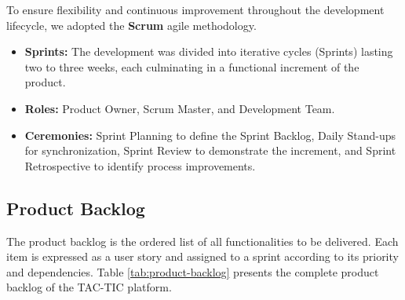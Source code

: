 To ensure flexibility and continuous improvement throughout the development lifecycle, we adopted the \textbf{Scrum} agile methodology.

\begin{itemize}
    \item \textbf{Sprints:} The development was divided into iterative cycles (Sprints) lasting two to three weeks, each culminating in a functional increment of the product.
    \item \textbf{Roles:} Product Owner, Scrum Master, and Development Team.
    \item \textbf{Ceremonies:} Sprint Planning to define the Sprint Backlog, Daily Stand-ups for synchronization, Sprint Review to demonstrate the increment, and Sprint Retrospective to identify process improvements.
\end{itemize}

\subsection{Product Backlog}
The product backlog is the ordered list of all functionalities to be delivered. Each item is expressed as a user story and assigned to a sprint according to its priority and dependencies. Table \ref{tab:product-backlog} presents the complete product backlog of the TAC-TIC platform.

